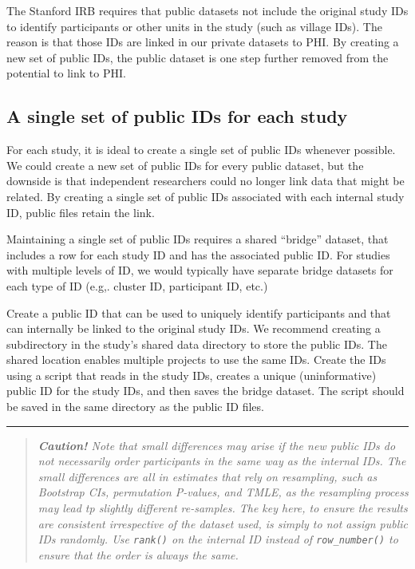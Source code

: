 \documentclass[
]{book}
\begin{document}
The Stanford IRB requires that public datasets not include the original study IDs to identify participants or other units in the study (such as village IDs). The reason is that those IDs are linked in our private datasets to PHI. By creating a new set of public IDs, the public dataset is one step further removed from the potential to link to PHI.

\subsection{A single set of public IDs for each study}\label{a-single-set-of-public-ids-for-each-study}

For each study, it is ideal to create a single set of public IDs whenever possible. We could create a new set of public IDs for every public dataset, but the downside is that independent researchers could no longer link data that might be related. By creating a single set of public IDs associated with each internal study ID, public files retain the link.

Maintaining a single set of public IDs requires a shared ``bridge'' dataset, that includes a row for each study ID and has the associated public ID. For studies with multiple levels of ID, we would typically have separate bridge datasets for each type of ID (e.g,. cluster ID, participant ID, etc.)

Create a public ID that can be used to uniquely identify participants and that can internally be linked to the original study IDs. We recommend creating a subdirectory in the study's shared data directory to store the public IDs. The shared location enables multiple projects to use the same IDs. Create the IDs using a script that reads in the study IDs, creates a unique (uninformative) public ID for the study IDs, and then saves the bridge dataset. The script should be saved in the same directory as the public ID files.

\begin{center}\rule{0.5\linewidth}{0.5pt}\end{center}

\begin{quote}
\emph{\textbf{Caution!} Note that small differences may arise if the new public IDs do not necessarily order participants in the same way as the internal IDs. The small differences are all in estimates that rely on resampling, such as Bootstrap CIs, permutation P-values, and TMLE, as the resampling process may lead tp slightly different re-samples. The key here, to ensure the results are consistent irrespective of the dataset used, is simply to not assign public IDs randomly. Use \texttt{rank()} on the internal ID instead of \texttt{row\_number()} to ensure that the order is always the same. }
\end{quote}
\end{document}
